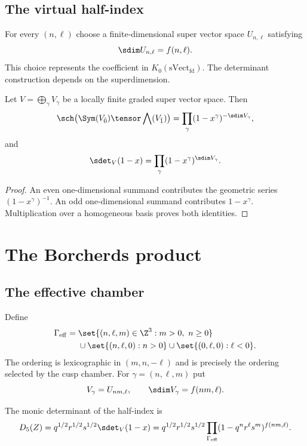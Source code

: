 \section{The virtual half-index}
For every $(n,\ell)$ choose a finite-dimensional super vector space $U_{n,\ell}$ satisfying
\[
 \sdim U_{n,\ell}=f(n,\ell).
\]
This choice represents the coefficient in $K_0(\mathrm{sVect}_{\mathrm{fd}})$. The determinant construction depends on the superdimension.

\begin{lemma}
Let $V=\bigoplus_{\gamma}V_\gamma$ be a locally finite graded super vector space. Then
\[
 \sch\bigl(\Sym(V_{\bar0})\tensor\bigwedge(V_{\bar1})\bigr)
 =\prod_\gamma(1-x^\gamma)^{-\sdim V_\gamma},
\]
and
\[
 \sdet_V(1-x)=\prod_\gamma(1-x^\gamma)^{\sdim V_\gamma}.
\]
\end{lemma}
\begin{proof}
An even one-dimensional summand contributes the geometric series $(1-x^\gamma)^{-1}$. An odd one-dimensional summand contributes $1-x^\gamma$. Multiplication over a homogeneous basis proves both identities.
\end{proof}

\chapter{The Borcherds product}
\section{The effective chamber}
Define
\[
\begin{aligned}
\Gammaeff={}&\set{(n,\ell,m)\in\Z^3:m>0,\ n\ge0}\\
&\cup\set{(n,\ell,0):n>0}
 \cup\set{(0,\ell,0):\ell<0}.
\end{aligned}
\]
The ordering is lexicographic in $(m,n,-\ell)$ and is precisely the ordering selected by the cusp chamber.
For $\gamma=(n,\ell,m)$ put
\[
 V_\gamma=U_{nm,\ell},
 \qquad \sdim V_\gamma=f(nm,\ell).
\]

\begin{definition}
The monic determinant of the half-index is
\[
 \Dmon(Z)=q^{1/2}r^{1/2}s^{1/2}
 \sdet_V(1-x)
 =q^{1/2}r^{1/2}s^{1/2}
 \prod_{\Gammaeff}(1-q^nr^\ell s^m)^{f(nm,\ell)}.
\]
\end{definition}

